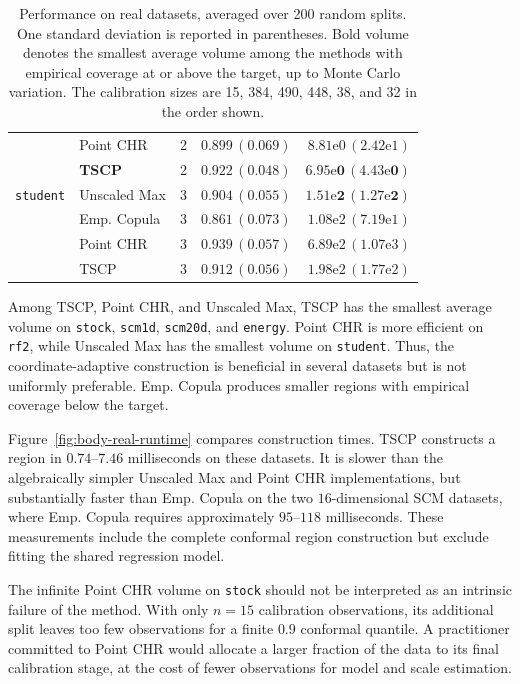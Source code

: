 \begin{table}[t]
\begin{tabular}{llrrr}
 & Point CHR & 2 & $0.899\,(0.069)$ & $8.81\mathrm{e}{0}\,(2.42\mathrm{e}{1})$ \\
 & \textbf{TSCP} & 2 & $0.922\,(0.048)$ & $\mathbf{6.95\mathrm{e}{0}\,(4.43\mathrm{e}{0})}$ \\
\addlinespace
\texttt{student} & Unscaled Max & 3 & $0.904\,(0.055)$ & $\mathbf{1.51\mathrm{e}{2}\,(1.27\mathrm{e}{2})}$ \\
 & Emp. Copula & 3 & $0.861\,(0.073)$ & $1.08\mathrm{e}{2}\,(7.19\mathrm{e}{1})$ \\
 & Point CHR & 3 & $0.939\,(0.057)$ & $6.89\mathrm{e}{2}\,(1.07\mathrm{e}{3})$ \\
 & TSCP & 3 & $0.912\,(0.056)$ & $1.98\mathrm{e}{2}\,(1.77\mathrm{e}{2})$ \\
\bottomrule
\end{tabular}
\caption{Performance on real datasets, averaged over 200 random splits. One
standard deviation is reported in parentheses. Bold volume denotes the
smallest average volume among the methods with empirical coverage at or above
the target, up to Monte Carlo variation. The calibration sizes are 15, 384,
490, 448, 38, and 32 in the order shown.}
\label{tab:real-data}
\end{table}

Among TSCP, Point CHR, and Unscaled Max, TSCP has the smallest average
volume on \texttt{stock}, \texttt{scm1d}, \texttt{scm20d}, and
\texttt{energy}. Point CHR is more efficient on \texttt{rf2}, while
Unscaled Max has the smallest volume on \texttt{student}. Thus, the
coordinate-adaptive construction is beneficial in several datasets but is
not uniformly preferable. Emp. Copula produces smaller regions with
empirical coverage below the target.

Figure~\ref{fig:body-real-runtime} compares construction times.
TSCP constructs a region in $0.74$--$7.46$ milliseconds on
these datasets. It is slower than the algebraically simpler Unscaled Max and
Point CHR implementations, but substantially faster than Emp. Copula on the
two $16$-dimensional SCM datasets, where Emp. Copula requires approximately
$95$--$118$ milliseconds. These measurements include the complete conformal
region construction but exclude fitting the shared regression model.

The infinite Point CHR volume on \texttt{stock} should not be interpreted as
an intrinsic failure of the method. With only $n=15$ calibration observations,
its additional split leaves too few observations for a finite $0.9$ conformal
quantile. A practitioner committed to Point CHR would allocate a larger
fraction of the data to its final calibration stage, at the cost of fewer
observations for model and scale estimation.

